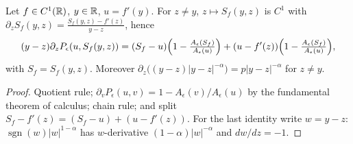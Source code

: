 \begin{lemma}
  \label{lem:c03_secant_ibp}
  Let $f\in C^1(\mathbb{R})$, $y\in\mathbb{R}$, $u=f'(y)$. For $z\ne y$, $z\mapsto S_f(y,z)$ is $C^1$ with
  $\partial_zS_f(y,z)=\frac{S_f(y,z)-f'(z)}{y-z}$, hence
  \begin{equation}\label{eqn:analysis_secant_integration_by_parts}
    (y-z)\partial_zP_\epsilon(u,S_f(y,z))=(S_f-u)\Bigl(1-\tfrac{A_\epsilon(S_f)}{A_\epsilon(u)}\Bigr)+(u-f'(z))\Bigl(1-\tfrac{A_\epsilon(S_f)}{A_\epsilon(u)}\Bigr),
  \end{equation}
  with $S_f=S_f(y,z)$. Moreover
  $\partial_z\bigl((y-z)|y-z|^{-\alpha}\bigr)=p|y-z|^{-\alpha}$ for $z\ne y$.
\end{lemma}
\begin{proof}
  Quotient rule; $\partial_vP_\epsilon(u,v)=1-A_\epsilon(v)/A_\epsilon(u)$ by the fundamental theorem of calculus; chain rule; and
  split $S_f-f'(z)=(S_f-u)+(u-f'(z))$. For the last identity write $w=y-z$: $\operatorname{sgn}(w)|w|^{1-\alpha}$ has $w$-derivative $(1-\alpha)|w|^{-\alpha}$ and $dw/dz=-1$.
\end{proof}

